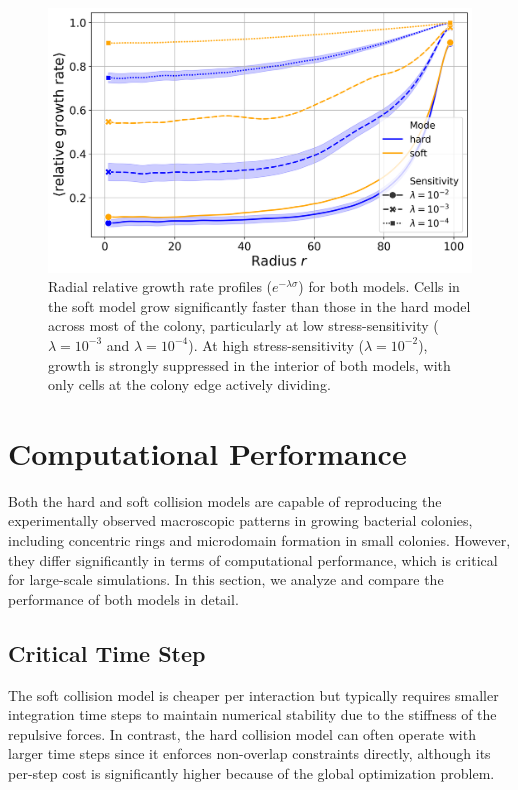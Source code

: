 \documentclass[conference]{IEEEtran}
\begin{document}
\begin{figure}[H]
    \centering
    \includegraphics[width=\linewidth]{figures/comparison_plots/combined_radial_impedance.png}
    \caption{Radial relative growth rate profiles ($e^{-\lambda \sigma}$) for both models. Cells in the soft model grow significantly faster than those in the hard model across most of the colony, particularly at low stress-sensitivity ($\lambda = 10^{-3}$ and $\lambda = 10^{-4}$). At high stress-sensitivity ($\lambda = 10^{-2}$), growth is strongly suppressed in the interior of both models, with only cells at the colony edge actively dividing.}
    \label{fig:radial_distribution_growth_rate}
\end{figure}

\section{Computational Performance}
\label{sec:performance_analysis}

Both the hard and soft collision models are capable of reproducing the experimentally observed macroscopic patterns in growing bacterial colonies, including concentric rings and microdomain formation in small colonies. However, they differ significantly in terms of computational performance, which is critical for large-scale simulations. In this section, we analyze and compare the performance of both models in detail.


\subsection{Critical Time Step}

The soft collision model is cheaper per interaction but typically requires smaller integration time steps to maintain numerical stability due to the stiffness of the repulsive forces. In contrast, the hard collision model can often operate with larger time steps since it enforces non-overlap constraints directly, although its per-step cost is significantly higher because of the global optimization problem.
\end{document}
